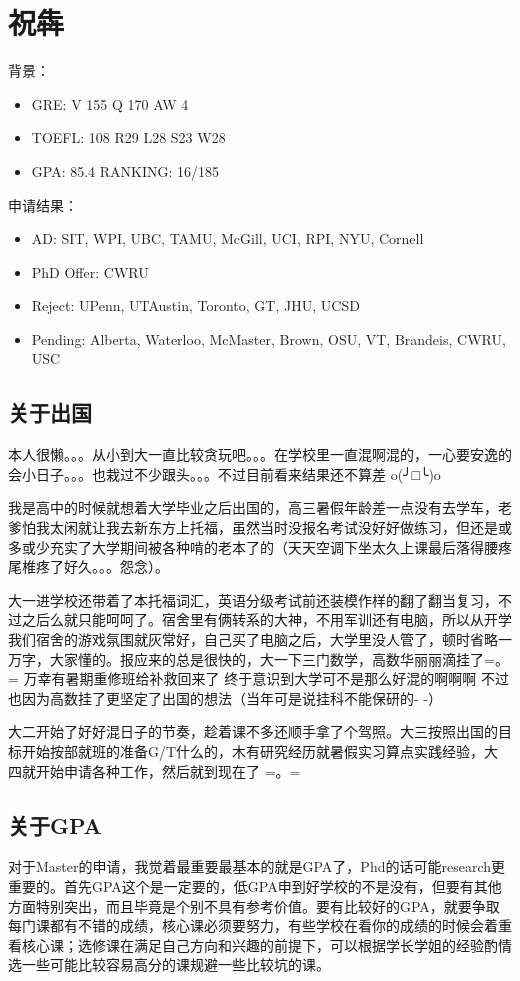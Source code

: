 \section{祝犇}
背景：
\begin{itemize}
\item GRE: V 155 Q 170 AW 4
\item TOEFL: 108 R29 L28 S23 W28
\item GPA: 85.4 RANKING: 16/185
\end{itemize}\par
申请结果：
\begin{itemize}
\item AD: SIT, WPI, UBC, TAMU, McGill, UCI, RPI, NYU, Cornell
\item PhD Offer: CWRU
\item Reject: UPenn, UTAustin, Toronto, GT, JHU, UCSD
\item Pending: Alberta, Waterloo, McMaster, Brown, OSU, VT, Brandeis, CWRU, USC
\end{itemize}
\subsection{关于出国}
本人很懒。。。从小到大一直比较贪玩吧。。。在学校里一直混啊混的，一心要安逸的会小日子。。。也栽过不少跟头。。。不过目前看来结果还不算差 o(╯□╰)o\par

我是高中的时候就想着大学毕业之后出国的，高三暑假年龄差一点没有去学车，老爹怕我太闲就让我去新东方上托福，虽然当时没报名考试没好好做练习，但还是或多或少充实了大学期间被各种啃的老本了的（天天空调下坐太久上课最后落得腰疼尾椎疼了好久。。。怨念）。\par

大一进学校还带着了本托福词汇，英语分级考试前还装模作样的翻了翻当复习，不过之后么就只能呵呵了。宿舍里有俩转系的大神，不用军训还有电脑，所以从开学我们宿舍的游戏氛围就灰常好，自己买了电脑之后，大学里没人管了，顿时省略一万字，大家懂的。报应来的总是很快的，大一下三门数学，高数华丽丽滴挂了=。= 万幸有暑期重修班给补救回来了 终于意识到大学可不是那么好混的啊啊啊 不过也因为高数挂了更坚定了出国的想法（当年可是说挂科不能保研的- -）\par

大二开始了好好混日子的节奏，趁着课不多还顺手拿了个驾照。大三按照出国的目标开始按部就班的准备G/T什么的，木有研究经历就暑假实习算点实践经验，大四就开始申请各种工作，然后就到现在了 =。=

\subsection{关于GPA}
对于Master的申请，我觉着最重要最基本的就是GPA了，Phd的话可能research更重要的。首先GPA这个是一定要的，低GPA申到好学校的不是没有，但要有其他方面特别突出，而且毕竟是个别不具有参考价值。要有比较好的GPA，就要争取每门课都有不错的成绩，核心课必须要努力，有些学校在看你的成绩的时候会着重看核心课；选修课在满足自己方向和兴趣的前提下，可以根据学长学姐的经验酌情选一些可能比较容易高分的课规避一些比较坑的课。\par

